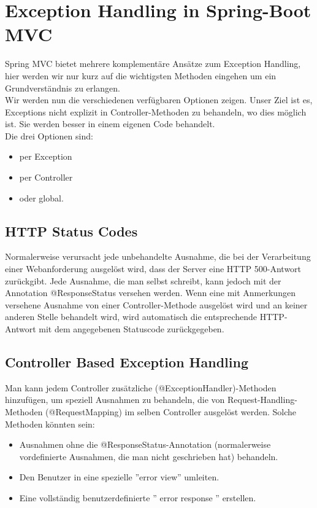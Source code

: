 \documentclass[12pt,a4paper]{article}
\begin{document}
\section{Exception Handling in Spring-Boot MVC}
Spring MVC bietet mehrere komplementäre Ansätze zum Exception Handling, hier werden wir nur kurz auf die wichtigsten Methoden eingehen um ein Grundverständnis zu erlangen.\\
Wir werden nun die verschiedenen verfügbaren Optionen zeigen. Unser Ziel ist es, Exceptions nicht explizit in Controller-Methoden zu behandeln, wo dies möglich ist. Sie werden besser in einem eigenen Code behandelt.\\
Die drei Optionen sind:
\begin{itemize}
	\item[\textbullet] per Exception
	\item[\textbullet] per Controller
	\item[\textbullet] oder global.
\end{itemize}


\subsection{HTTP Status Codes}
Normalerweise verursacht jede unbehandelte Ausnahme, die bei der Verarbeitung einer Webanforderung ausgelöst wird, dass der Server eine HTTP 500-Antwort zurückgibt. Jede Ausnahme, die man selbst schreibt, kann jedoch mit der Annotation @ResponseStatus versehen werden. Wenn eine mit Anmerkungen versehene Ausnahme von einer Controller-Methode ausgelöst wird und an keiner anderen Stelle behandelt wird, wird automatisch die entsprechende HTTP-Antwort mit dem angegebenen Statuscode zurückgegeben.


\subsection{Controller Based Exception Handling}
Man kann jedem Controller zusätzliche (@ExceptionHandler)-Methoden hinzufügen, um speziell Ausnahmen zu behandeln, die von Request-Handling-Methoden (@RequestMapping) im selben Controller ausgelöst werden. Solche Methoden könnten sein:
\begin{itemize}
	\item[\textbullet] Ausnahmen ohne die @ResponseStatus-Annotation (normalerweise vordefinierte Ausnahmen, die man nicht geschrieben hat) behandeln.
	\item[\textbullet] Den Benutzer in eine spezielle ''error view'' umleiten.
	\item[\textbullet] Eine vollständig benutzerdefinierte '' error response '' erstellen.
\end{itemize}
\end{document}
